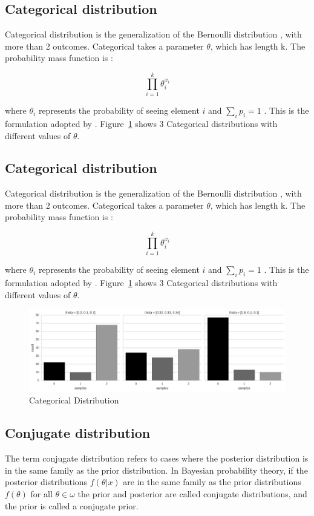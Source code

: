 \subsection*{Categorical distribution}
Categorical distribution is the generalization of the Bernoulli distribution , with more than 2 outcomes.  Categorical takes a parameter $\theta$, which has length k. The probability mass function is :

$$
\prod_{i=1}^k \theta_i^{x_i}
$$

where $\theta_i$ represents the probability of seeing element $i$ and $\sum_{i}p_i = 1$ . This is the formulation adopted by \cite{bishop2007pattern}.  Figure~\ref{fig:Categorical_sample} shows 3 Categorical distributions with different values of $\theta$.

\subsection*{Categorical distribution}
Categorical distribution is the generalization of the Bernoulli distribution , with more than 2 outcomes.  Categorical takes a parameter $\theta$, which has length k. The probability mass function is :

$$
\prod_{i=1}^k \theta_i^{x_i}
$$

where $\theta_i$ represents the probability of seeing element $i$ and $\sum_{i}p_i = 1$ . This is the formulation adopted by \cite{bishop2007pattern}.  Figure~\ref{fig:Categorical_sample} shows 3 Categorical distributions with different values of $\theta$.

\begin{figure}[htp]
\centering
\includegraphics[width=\textwidth]{images/Categorical.png}
\caption{Categorical Distribution}
\label{fig:Categorical_sample}
\end{figure}


\subsection*{Conjugate distribution}
The term conjugate distribution \cite{BS:BS3830070108} refers to cases where the posterior distribution is in the same family as the prior distribution. In Bayesian probability theory, if the posterior distributions $f(\theta | x)$ are in the same family as the prior distributions $f(\theta)$ for all $\theta \in \omega $ the prior and posterior are called conjugate distributions, and the prior is called a conjugate prior. 


